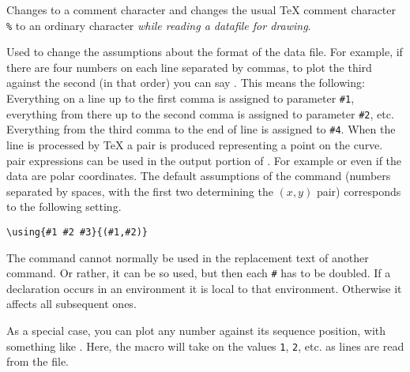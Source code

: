 \documentclass[letterpaper]{article}
\begin{document}
\begin{cd}
\cs{}%
\end{cd}

Changes  to a comment character and changes the usual \TeX{}
comment character \texttt{\%} to an ordinary character \emph{while reading a
datafile for drawing}.

\begin{cd}
%
\end{cd}

Used to change the assumptions about the format of the data file. For
example, if there are four numbers on each line separated by commas, to
plot the third against the second (in that order) you can say
. This means the
following: Everything on a line up to the first comma is assigned to
parameter \texttt{\#1}, everything from there up to the second comma is
assigned to parameter \texttt{\#2}, etc. Everything from the third comma
to the end of line is assigned to \texttt{\#4}. When the line is
processed by \TeX{} a \MF{} pair is produced representing a point on the
curve. \CMF{} pair expressions can be used in the output portion of
. For example 
or even  if the data
are polar coordinates. The default assumptions of the 
command (numbers separated by spaces, with the first two determining the
$(x,y)$ pair) corresponds to the following setting.
\begin{verbatim}
\using{#1 #2 #3}{(#1,#2)}
\end{verbatim}
The  command cannot normally be used in the replacement text
of another command. Or rather, it can be so used, but then each
\texttt{\#} has to be doubled. If a  declaration occurs in an
 environment it is local to that environment. Otherwise it
affects all subsequent ones.

\begin{cd}
%
\end{cd}

As a special case, you can plot any number against its sequence
position, with something like
. Here, the macro
 will take on the values \texttt{1}, \texttt{2}, etc. as
lines are read from the file.
\end{document}
